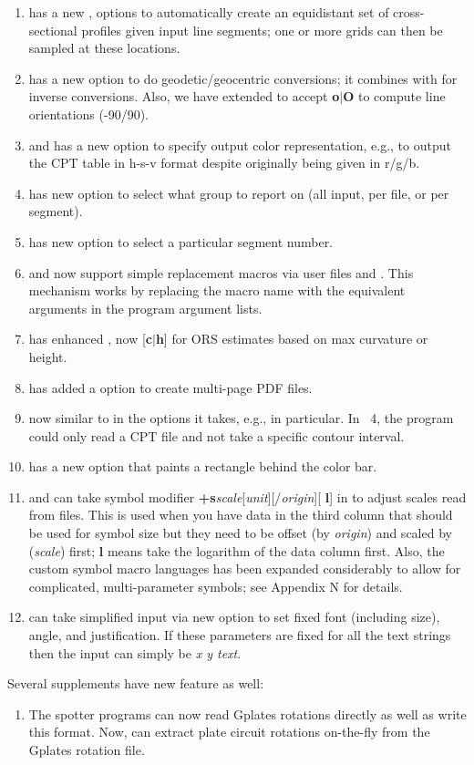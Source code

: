 \begin{enumerate}
	\item {} has a new ,  options to automatically create an equidistant set of cross-sectional
		profiles given input line segments; one or more grids can then be sampled at these locations.
	\item {} has a new  option to do geodetic/geocentric conversions; it combines with 
		for inverse conversions.  Also, we have extended  to accept \textbf{o}$|$\textbf{O} to compute line orientations (-90/90).
	\item {} and  has a new  option to specify output color representation, e.g.,
		to output the CPT table in h-s-v format despite originally being given in r/g/b.
	\item {} has new option  to select what group to report on (all input, per file, or per segment).
	\item {} has new option  to select a particular segment number.
	\item {} and  now support simple replacement macros via user files
		 and .  This mechanism works by replacing the macro name
		with the equivalent arguments in the program argument lists.
	\item {} has enhanced , now [\textbf{c}$|$\textbf{h}] for ORS estimates based on max curvature or height.
	\item {} has added a  option to create multi-page PDF files.
	\item {} now similar to  in the options it takes, e.g.,  in particular.
		In \GMT\ 4, the program could only read a CPT file and not take a specific contour interval.
	\item {} has a new option  that paints a rectangle behind the color bar.
	\item {} and  can take symbol modifier \textbf{+s}\emph{scale}[\emph{unit}][/\emph{origin}][{ \bf l}]
		in  to adjust scales read from files.  This is used when you have data in the third column that should be
		used for symbol size but they need to be offset (by \emph{origin}) and scaled by (\emph{scale}) first; \textbf{l} means
		take the logarithm of the data column first.  Also, the custom symbol macro languages has been expanded considerably
		to allow for complicated, multi-parameter symbols; see Appendix N for details.
	\item {} can take simplified input via new option  to set fixed font (including size), angle, and justification.  If
		these parameters are fixed for all the text strings then the input can simply be \emph{x y text}.
	
\end{enumerate}

Several supplements have new feature as well:

\begin{enumerate}
	\item The spotter programs can now read Gplates rotations directly as well as write this format.
		Now,  can extract plate circuit rotations on-the-fly from the Gplates rotation file.
\end{enumerate}
